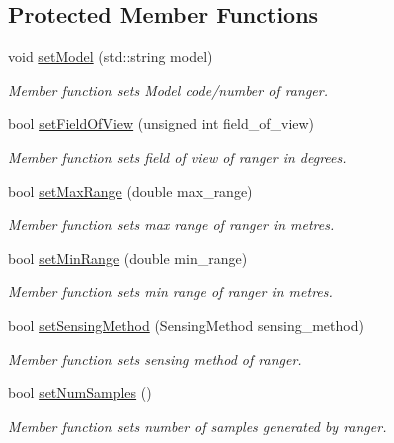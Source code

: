 \subsection*{Protected Member Functions}
\begin{DoxyCompactItemize}
\item 
void \hyperlink{classRanger_a5f76a88ea219e76ffa63d892fbcc70cb}{set\+Model} (std\+::string model)
\begin{DoxyCompactList}\small\item\em Member function sets Model code/number of ranger. \end{DoxyCompactList}\item 
bool \hyperlink{classRanger_a24876a4b461be9e61ba0c5e2df54d08f}{set\+Field\+Of\+View} (unsigned int field\+\_\+of\+\_\+view)
\begin{DoxyCompactList}\small\item\em Member function sets field of view of ranger in degrees. \end{DoxyCompactList}\item 
bool \hyperlink{classRanger_a4f288b0c2f0fca16b0ac2af14e91a0e1}{set\+Max\+Range} (double max\+\_\+range)
\begin{DoxyCompactList}\small\item\em Member function sets max range of ranger in metres. \end{DoxyCompactList}\item 
bool \hyperlink{classRanger_a8264b4a174d08df2bda42b70d1e45f22}{set\+Min\+Range} (double min\+\_\+range)
\begin{DoxyCompactList}\small\item\em Member function sets min range of ranger in metres. \end{DoxyCompactList}\item 
bool \hyperlink{classRanger_ae078104d1526fb6f1ab1c2e3a2b3d142}{set\+Sensing\+Method} (Sensing\+Method sensing\+\_\+method)
\begin{DoxyCompactList}\small\item\em Member function sets sensing method of ranger. \end{DoxyCompactList}\item 
bool \hyperlink{classRanger_a4f103e829a5fd74159f9c3f4d5fd3bf3}{set\+Num\+Samples} ()
\begin{DoxyCompactList}\small\item\em Member function sets number of samples generated by ranger. \end{DoxyCompactList}\end{DoxyCompactItemize}
